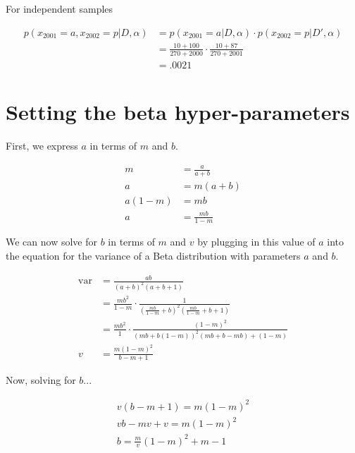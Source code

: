 \documentclass{article}
\begin{document}
For independent samples

\begin{align*}
  p(x_{2001}=a, x_{2002}=p|D,\alpha) &= p(x_{2001}=a|D,\alpha)
                                           \cdot
                                           p(x_{2002}=p|D',\alpha)
  \\
                                         &= \frac{10 + 100}{270 +
                                           2000} \cdot \frac{10 +
                                           87}{270 + 2001} \\
                                         &= .0021
\end{align*}

\section{Setting the beta hyper-parameters}

First, we express $a$ in terms of $m$ and $b$.

\begin{align*}
  m &= \frac{a}{a+b} \\
  a &= m(a + b)  \\
  a(1 - m) &= mb \\
  a &= \frac{mb}{1 - m}
\end{align*}

We can now solve for $b$ in terms of $m$ and $v$ by plugging in this
value of $a$ into the equation for the variance of a Beta distribution
with parameters $a$ and $b$.

\begin{align*}
  \text{var} &= \frac{ab}{(a+b)^2(a+b+1)} \\
             &= \frac{mb^2}{1-m} \cdot \frac{1}{\left( \frac{mb}{1-m}
               + b \right)^2 \left ( \frac{mb}{1-m} + b + 1 \right) }
  \\
             &= \frac{mb^2}{1} \cdot \frac{(1-m)^2}{\left( mb + b(1-m)
               \right)^2 (mb + b - mb) + (1 - m)} \\
  v &= \frac{m(1 - m)^2}{b - m + 1}
\end{align*}

Now, solving for $b$...

\begin{align*}
  v(b-m+1) = m(1-m)^2 \\
  vb - mv + v = m(1-m)^2 \\
  b = \frac{m}{v}(1-m)^2 + m - 1
\end{align*}
\end{document}
